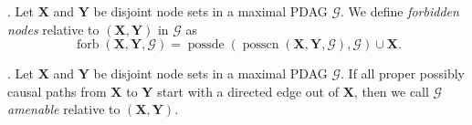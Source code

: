 \documentclass[11pt,a4paper]{article}
\newtheorem{Example}[Satz]{Example}
\theoremstyle{definition}
\theoremstyle{remark}
\DeclareMathOperator{\Forbb}{forb}
\DeclareMathOperator{\de}{de}
\DeclareMathOperator{\possde}{possde}
\DeclareMathOperator{\CN}{cn}
\DeclareMathOperator{\possCN}{posscn}
\newcommand{\mpdag}{maximal PDAG}
\newcommand{\g}[1][G]{\mathcal{#1}}
\newcommand{\f}[2][X,Y]{\Forbb(#1,#2)}
\newcommand{\fb}[2][X,Y]{\Forbb(\mathbf{#1},#2)}
\newcommand{\cn}[2][X,Y]{\CN(#1,#2)}
\newcommand{\posscn}[2][X,Y]{\possCN(#1,#2)}
\newcommand{\posscnb}[2][X,Y]{\possCN(\mathbf{#1},#2)}
\newcommand{\vsp}{\vspace{.2cm}}
\begin{document}
 
 \vsp{}. \citep[Cf.][]{perkovic16} Let $\mathbf{X}$ and $\mathbf{Y}$ be disjoint node sets in a \mpdag{} $\g$. We define \textit{forbidden nodes} relative to $(\mathbf{X},\mathbf{Y})$ in $\g$ as
 \[
 \fb{\g} = \possde(\posscnb{\g}, \g) \cup \mathbf{X}.
 \]
 
 
 
 
 \vsp{}. \citep{perkovic16}  Let $\mathbf{X}$ and $\mathbf{Y}$ be disjoint node sets in a \mpdag{} $\g$. If all proper possibly causal paths from $\mathbf{X}$ to $\mathbf{Y}$ start with a directed edge out of $\mathbf{X}$, then we call $\g$ \textit{amenable} relative to $(\mathbf{X},\mathbf{Y})$. 
 
\end{document}
